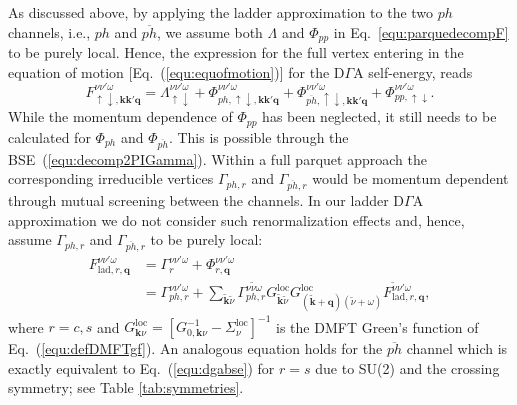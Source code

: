 \documentclass[rmp,aps,reprint,amsmath,amssymb,superscriptaddress,showpacs,nofootinbib]{revtex4-1}
\begin{document}
As discussed above, by applying the ladder approximation to the two $ph$ channels, i.e., $ph$ and $\overline{ph}$, we assume both $\Lambda$ and $\Phi_{pp}$ in Eq.~\eqref{equ:parquedecompF} to be purely local. Hence, the expression for the full vertex entering in the equation of motion [Eq.~(\ref{equ:equofmotion})] for the D$\Gamma$A self-energy, reads 
\begin{equation}
\label{equ:dgaladderapprox}
 F_{\uparrow\downarrow,\mathbf{k}\mathbf{k}'\mathbf{q}}^{\nu\nu'\omega}=\Lambda_{\uparrow\downarrow}^{\nu\nu'\omega}+\Phi_{ph,\uparrow\downarrow,\mathbf{k}\mathbf{k}'\mathbf{q}}^{\nu\nu'\omega}+\Phi_{\overline{ph},\uparrow\downarrow,\mathbf{k}\mathbf{k}'\mathbf{q}}^{\nu\nu'\omega}+\Phi_{pp,\uparrow\downarrow}^{\nu\nu'\omega}.
\end{equation}
While the  momentum dependence of $\Phi_{pp}$ has been neglected, it  still needs to  be calculated for $\Phi_{ph}$ and  $\Phi_{\overline{ph}}$. This is possible through the BSE~(\ref{equ:decomp2PIGamma}). Within a full parquet approach the corresponding irreducible vertices $\Gamma_{ph,r}$ and $\Gamma_{\overline{ph},r}$ would be momentum dependent through mutual screening between the channels. In our ladder D$\Gamma$A approximation we do not consider such renormalization effects and, hence, assume $\Gamma_{ph,r}$ and $\Gamma_{\overline{ph},r}$ to be purely local:
\begin{align}
 \label{equ:dgabse}
  \! \!F_{\text{lad},r,\mathbf{q}}^{\nu\nu'\omega}&=\Gamma_{r}^{\nu\nu'\omega}+\Phi_{r,\mathbf{q}}^{\nu\nu'\omega}\nonumber\\&=  \Gamma_{ph,r}^{\nu\nu'\omega}+\!\sum_{\tilde{\mathbf{k}}\tilde{\nu}}\Gamma_{ph,r}^{\nu\tilde{\nu}\omega}G^{\text{loc}}_{\tilde{\mathbf{k}}\tilde{\nu}}G^{\text{loc}}_{(\tilde{\mathbf{k}}+\!\mathbf{q})(\tilde{\nu}\!+\!\omega)}F_{\text{lad},r,\mathbf{q}}^{\tilde{\nu}\nu'\omega},
\end{align}
where $r=c,s$ and  $G^{\text{loc}}_{\mathbf{k}\nu}=[G^{-1}_{0,\mathbf{k}\nu}-\Sigma^{\text{loc}}_\nu]^{-1}$ is the  DMFT Green's function of Eq.~(\ref{equ:defDMFTgf}). An analogous equation holds for the $\overline{ph}$ channel which is exactly equivalent to Eq.~(\ref{equ:dgabse}) for $r=s$ due to SU(2) and the crossing symmetry; see Table \ref{tab:symmetries}.
\end{document}
